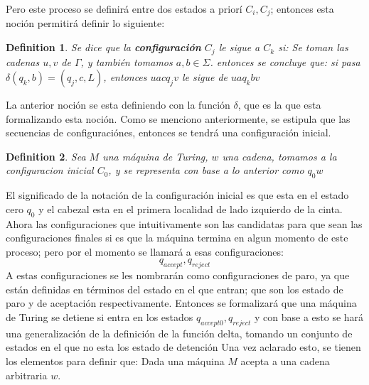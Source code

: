 \documentclass[10pt]{report}
\newtheorem{definition}{Definition}
\begin{document}
    Pero este proceso se definirá entre dos estados a priorí $C_{i},C_{j}$;
    entonces esta noción permitirá definir lo siguiente:
    \begin{definition}
        Se dice que la \textbf{configuración} $C_{j}$ le sigue a $C_{k}$ si:
        Se toman las cadenas $u,v$ de $\Gamma$, y también tomamos $a,b\in \Sigma$.
        entonces se concluye que: si pasa $\delta(q_{k},b) = (q_{j},c,L)$,
        entonces $uacq_{j}v$ le sigue de $uaq_{k}bv$

    \end{definition}
    La anterior noción se esta definiendo con la función $\delta$, que es la que esta formalizando esta noción.
    Como se menciono anteriormente, se estipula que las secuencias de configuraciónes, entonces se tendrá una configuración
    inicial.
    \begin{definition}
        Sea $M$ una máquina de Turing, $w$ una cadena, tomamos a
         la configuracion inicial $C_{0}$, y se representa con base a lo anterior como $q_{0}w$
        \end{definition}
    \newline
    El significado de la notación de la configuración inicial es que esta en
    el estado cero $q_{0}$ y el cabezal esta en el primera localidad de lado izquierdo de la cinta.
    Ahora las configuraciones que intuitivamente son las candidatas para
    que sean las configuraciones finales si es que la máquina termina en algun momento de este
    proceso; pero por el momento se llamará a esas configuraciones:\newline
    \begin{equation}
        q_{accept}, q_{reject}\label{eq:equation8}
    \end{equation}
    A estas configuraciones se les nombrarán como configuraciones de paro, ya que están definidas
    en términos del estado en el que entran; que son los estado de paro y de aceptación respectivamente.\newline
    Entonces se formalizará que una máquina de Turing se detiene si entra en los estados
    $q_{accept0},q_{reject}$ y con base a esto se hará una generalización de la definición de la función delta, tomando
    un conjunto de estados en el que no esta los estado de detención
    \newline
    Una vez aclarado esto, se tienen los elementos para definir que:\newline
    Dada una máquina $M$ acepta a una
    cadena arbitraria $w$.  
\end{document}
